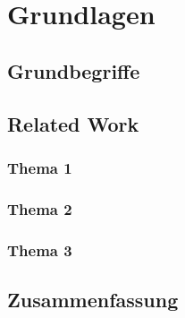 \chapter{Grundlagen}


\section{Grundbegriffe}

\section{Related Work} %

\subsection{Thema 1}

\subsection{Thema 2}

\subsection{Thema 3}


\section{Zusammenfassung}
